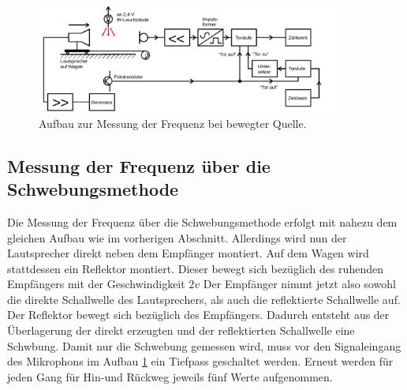 \begin{figure}
	\includegraphics[width=0.9\textwidth]{Bilder/Frequenz.png}
	\caption{Aufbau zur Messung der Frequenz bei bewegter Quelle. \cite{Anleitung}}
	\label{fig:delphin}
\end{figure}

\subsection{Messung der Frequenz über die Schwebungsmethode}
Die Messung der Frequenz über die Schwebungsmethode erfolgt mit nahezu dem gleichen Aufbau wie im vorherigen Abschnitt.
Allerdings wird nun der Lautsprecher direkt neben dem Empfänger montiert.
Auf dem Wagen wird stattdessen ein Reflektor montiert. Dieser bewegt sich bezüglich des ruhenden Empfängers mit der Geschwindigkeit $2v$
Der Empfänger nimmt jetzt also sowohl die direkte Schallwelle des Lautsprechers, als auch die reflektierte Schallwelle auf.
Der Reflektor bewegt sich bezüglich des Empfängers. Dadurch entsteht aus der Überlagerung der direkt erzeugten und der reflektierten Schallwelle eine Schwbung.
Damit nur die Schwebung gemessen wird, muss vor den Signaleingang des Mikrophons im Aufbau \ref{fig:delphin} ein Tiefpass geschaltet werden.
Erneut werden für jeden Gang für Hin-und Rückweg jeweils fünf Werte aufgenommen.
